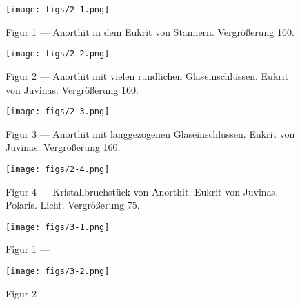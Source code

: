 \documentclass[a4paper, 12pt, oneside]{article}
\begin{document}
\vspace*{\fill}
\begin{figure}[H]
\centering
\texttt{[image: figs/2-1.png]}
\caption{\small Figur 1 --- Anorthit in dem Eukrit von Stannern. Vergrößerung 160.}
\end{figure}
\vspace*{\fill}
\clearpage

\vspace*{\fill}
\begin{figure}[H]
\centering
\texttt{[image: figs/2-2.png]}
\caption{\small Figur 2 --- Anorthit mit vielen rundlichen Glaseinschlüssen. Eukrit von Juvinas. Vergrößerung 160.}
\end{figure}
\vspace*{\fill}
\clearpage

\vspace*{\fill}
\begin{figure}[H]
\centering
\texttt{[image: figs/2-3.png]}
\caption{\small Figur 3 --- Anorthit mit langgezogenen Glaseinschlüssen. Eukrit von Juvinas. Vergrößerung 160.}
\end{figure}
\vspace*{\fill}
\clearpage

\vspace*{\fill}
\begin{figure}[H]
\centering
\texttt{[image: figs/2-4.png]}
\caption{\small Figur 4 --- Kristallbruchstück von Anorthit. Eukrit von Juvinas. Polaris. Licht. Vergrößerung 75.}
\end{figure}
\vspace*{\fill}
\clearpage

\vspace*{\fill}
\begin{figure}[H]
\centering
\texttt{[image: figs/3-1.png]}
\caption{\small Figur 1 --- }
\end{figure}
\vspace*{\fill}
\clearpage

\vspace*{\fill}
\begin{figure}[H]
\centering
\texttt{[image: figs/3-2.png]}
\caption{\small Figur 2 --- }
\end{figure}
\vspace*{\fill}
\clearpage
\end{document}
